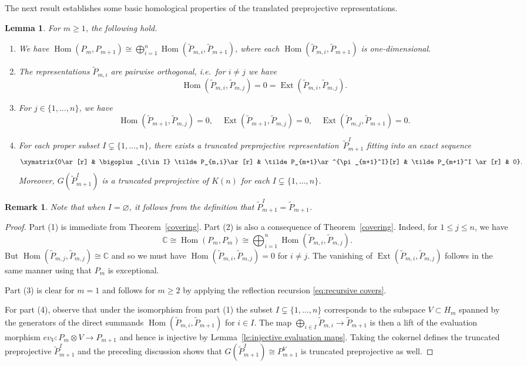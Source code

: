 \documentclass{amsart}
\newtheorem{lemma}[theorem]{Lemma}
\newtheorem{remark}[theorem]{Remark}
\numberwithin{equation}{section}
\newcommand{\CC}{\mathbb{C}}
\newcommand{\Ext}{\operatorname{Ext}}
\newcommand{\Hom}{\operatorname{Hom}}
\newcommand{\sesm}[4]{\xymatrix{0\ar[r] & #1\ar[r] & #2\ar^{#4}[r] & #3 \ar[r] & 0}}
\begin{document}
The next result establishes some basic homological properties of the translated preprojective representations.
\begin{lemma}
  \label{le:homdecomposition}
  For $m\geq 1$, the following hold.
  \begin{enumerate}
    \item We have $\Hom(P_m,P_{m+1})\cong\bigoplus\limits_{i=1}^n \Hom(\tilde P_{m,i},\tilde P_{m+1})$, where each $\Hom(\tilde P_{m,i},\tilde P_{m+1})$ is one-dimensional.
    \item The representations $\tilde P_{m,i}$ are pairwise orthogonal, i.e.\ for $i\neq j$ we have 
      \[\Hom(\tilde P_{m,i},\tilde P_{m,j})=0=\Ext(\tilde P_{m,i},\tilde P_{m,j}).\]
    \item For $j\in\{1,\ldots,n\}$, we have
      \[\Hom(\tilde P_{m+1},\tilde P_{m,j})=0,\quad\Ext(\tilde P_{m+1},\tilde P_{m,j})=0,\quad\Ext(\tilde P_{m,j},\tilde P_{m+1})=0.\]
    \item For each proper subset $I\subsetneq\{1,\ldots,n\}$, there exists a truncated preprojective representation~$\tilde P_{m+1}^I$ fitting into an exact sequence 
      \begin{equation}
        \label{ses1}
        \sesm{\bigoplus_{i\in I} \tilde P_{m,i}}{\tilde P_{m+1}}{\tilde P_{m+1}^I}{\pi_{m+1}^I}.
      \end{equation}
      Moreover, $G(\tilde P_{m+1}^I)$ is a truncated preprojective of $K(n)$ for each $I\subsetneq\{1,\ldots,n\}$.
  \end{enumerate}
\end{lemma}
\begin{remark}
  Note that when $I=\varnothing$, it follows from the definition that $\tilde P_{m+1}^I=\tilde P_{m+1}$.
\end{remark}
\begin{proof}
  Part (1) is immediate from Theorem~\ref{covering}.
  Part (2) is also a consequence of Theorem~\ref{covering}.
  Indeed, for $1\leq j\leq n$, we have 
  $$\CC\cong\Hom(P_m,P_m)\cong\bigoplus_{i=1}^n \Hom(\tilde P_{m,i},\tilde P_{m,j}).$$
  But $\Hom(\tilde P_{m,j},\tilde P_{m,j})\cong\CC$ and so we must have $\Hom(\tilde P_{m,i},\tilde P_{m,j})=0$ for $i\neq j$.
  The vanishing of $\Ext(\tilde P_{m,i},\tilde P_{m,j})$ follows in the same manner using that $P_m$ is exceptional.

  Part (3) is clear for $m=1$ and follows for $m\ge2$ by applying the reflection recursion \eqref{eq:recursive covers}.

  For part (4), observe that under the isomorphism from part (1) the subset $I\subsetneq\{1,\ldots,n\}$ corresponds to the subspace $V\subset H_m$ spanned by the generators of the direct summands $\Hom(\tilde P_{m,i},\tilde P_{m+1})$ for $i\in I$.
  The map $\bigoplus_{i\in I} \tilde P_{m,i}\to\tilde P_{m+1}$ is then a lift of the evaluation morphism $ev_V:P_m\otimes V\to P_{m+1}$ and hence is injective by Lemma~\ref{le:injective evaluation maps}.
  Taking the cokernel defines the truncated preprojective $\tilde P_{m+1}^I$ and the preceding discussion shows that $G(\tilde P_{m+1}^I)\cong P_{m+1}^V$ is truncated preprojective as well.
\end{proof}
\end{document}
